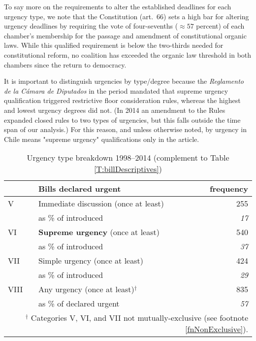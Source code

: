 \documentclass[letter,12pt]{article}
\begin{document}
To say more on the requirements to alter the established deadlines for each urgency type, we note that the Constitution (art.~66) sets a high bar for altering urgency deadlines by requiring the vote of four-sevenths ($\approx 57$ percent) of each chamber's membership for the passage and amendment of constitutional organic laws. While this qualified requirement is below the two-thirds needed for constitutional reform, no coalition has exceeded the organic law threshold in both chambers since the return to democracy. 

It is important to distinguish urgencies by type/degree because the \emph{Reglamento de la Cámara de Diputados} in the period mandated that supreme urgency qualification triggered restrictive floor consideration rules, whereas the highest and lowest urgency degrees did not. (In 2014 an amendment to the Rules expanded closed rules to two types of urgencies, but this falls outside the time span of our analysis.) For this reason, and unless otherwise noted, by urgency in Chile means "supreme urgency" qualifications only in the article. 

\begin{table}
\centering
\caption{Urgency type breakdown 1998--2014 (complement to Table \ref{T:billDescriptives})}\label{T:billDescriptivesPartB}
\begin{tabular}{llr}
    & Bills declared urgent                        &  frequency   \\ \hline
V   & Immediate discussion (once at least)         &         255  \\
    & as \% of introduced                          &   \emph{17}  \\ \hdashline
VI  & \textbf{Supreme urgency} (once at least)     &         540  \\
    & as \% of introduced                          &   \emph{37}  \\ \hdashline
VII & Simple urgency (once at least)               &         424  \\
    & as \% of introduced                          &   \emph{29}  \\ \hdashline
VIII& Any urgency (once at least)$^\dagger$          &         835  \\
    & as \% of declared urgent                     &   \emph{57}  \\
\hline
\multicolumn{3}{r}{\footnotesize{$^\dagger$ Categories V, VI, and VII not mutually-exclusive (see footnote \ref{fnNonExclusive}).}} \\
\end{tabular}
\end{table}
\end{document}
